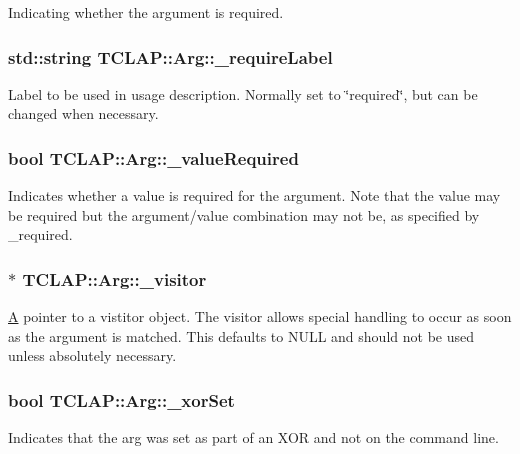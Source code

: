 Indicating whether the argument is required. \hypertarget{class_t_c_l_a_p_1_1_arg_a2ed097a868e34a0c4f6062ead744ac54}{
\subsubsection[{\+\_\+require\+Label}]{\setlength{\rightskip}{0pt plus 5cm}std\+::string T\+C\+L\+A\+P\+::\+Arg\+::\+\_\+require\+Label\hspace{0.3cm}{\ttfamily [protected]}}}\label{class_t_c_l_a_p_1_1_arg_a2ed097a868e34a0c4f6062ead744ac54}
Label to be used in usage description. Normally set to \char`\"{}required\char`\"{}, but can be changed when necessary. \hypertarget{class_t_c_l_a_p_1_1_arg_a776682b7e19f4dc231bbad3d10034dfa}{
\subsubsection[{\+\_\+value\+Required}]{\setlength{\rightskip}{0pt plus 5cm}bool T\+C\+L\+A\+P\+::\+Arg\+::\+\_\+value\+Required\hspace{0.3cm}{\ttfamily [protected]}}}\label{class_t_c_l_a_p_1_1_arg_a776682b7e19f4dc231bbad3d10034dfa}
Indicates whether a value is required for the argument. Note that the value may be required but the argument/value combination may not be, as specified by \+\_\+required. \hypertarget{class_t_c_l_a_p_1_1_arg_aa9ff037e92c9fa5bd85e532f61899300}{
\subsubsection[{\+\_\+visitor}]{$\ast$ T\+C\+L\+A\+P\+::\+Arg\+::\+\_\+visitor\hspace{0.3cm}{\ttfamily [protected]}}}\label{class_t_c_l_a_p_1_1_arg_aa9ff037e92c9fa5bd85e532f61899300}
\hyperlink{class_a}{A} pointer to a vistitor object. The visitor allows special handling to occur as soon as the argument is matched. This defaults to N\+U\+L\+L and should not be used unless absolutely necessary. \hypertarget{class_t_c_l_a_p_1_1_arg_ab413bd1d8a7ecf3c89672ee23ef791ba}{
\subsubsection[{\+\_\+xor\+Set}]{\setlength{\rightskip}{0pt plus 5cm}bool T\+C\+L\+A\+P\+::\+Arg\+::\+\_\+xor\+Set\hspace{0.3cm}{\ttfamily [protected]}}}\label{class_t_c_l_a_p_1_1_arg_ab413bd1d8a7ecf3c89672ee23ef791ba}
Indicates that the arg was set as part of an X\+O\+R and not on the command line. 